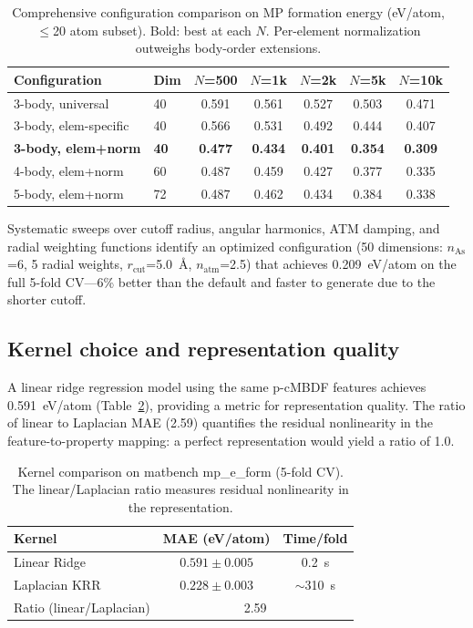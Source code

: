 \documentclass[twocolumn]{article}
\begin{document}
\begin{table}[t]
\centering
\small
\caption{Comprehensive configuration comparison on MP formation energy (eV/atom, $\leq$20 atom subset). Bold: best at each $N$. Per-element normalization outweighs body-order extensions.}
\label{tab:comprehensive}
\begin{tabular}{llccccc}
\toprule
Configuration & Dim & $N$=500 & $N$=1k & $N$=2k & $N$=5k & $N$=10k \\
\midrule
3-body, universal & 40 & 0.591 & 0.561 & 0.527 & 0.503 & 0.471 \\
3-body, elem-specific & 40 & 0.566 & 0.531 & 0.492 & 0.444 & 0.407 \\
\textbf{3-body, elem+norm} & \textbf{40} & \textbf{0.477} & \textbf{0.434} & \textbf{0.401} & \textbf{0.354} & \textbf{0.309} \\
4-body, elem+norm & 60 & 0.487 & 0.459 & 0.427 & 0.377 & 0.335 \\
5-body, elem+norm & 72 & 0.487 & 0.462 & 0.434 & 0.384 & 0.338 \\
\bottomrule
\end{tabular}
\end{table}

Systematic sweeps over cutoff radius, angular harmonics, ATM damping, and radial weighting functions identify an optimized configuration (50 dimensions: $n_\text{As}$=6, 5 radial weights, $r_\text{cut}$=5.0~\AA, $n_\text{atm}$=2.5) that achieves 0.209~eV/atom on the full 5-fold CV---6\% better than the default and faster to generate due to the shorter cutoff.

\subsection{Kernel choice and representation quality}

A linear ridge regression model using the same p-cMBDF features achieves 0.591~eV/atom (Table~\ref{tab:kernels}), providing a metric for representation quality.
The ratio of linear to Laplacian MAE (2.59) quantifies the residual nonlinearity in the feature-to-property mapping: a perfect representation would yield a ratio of 1.0.

\begin{table}[h]
\centering
\small
\caption{Kernel comparison on matbench mp\_e\_form (5-fold CV). The linear/Laplacian ratio measures residual nonlinearity in the representation.}
\label{tab:kernels}
\begin{tabular}{lcc}
\toprule
Kernel & MAE (eV/atom) & Time/fold \\
\midrule
Linear Ridge & $0.591 \pm 0.005$ & 0.2~s \\
Laplacian KRR & $0.228 \pm 0.003$ & $\sim$310~s \\
\midrule
Ratio (linear/Laplacian) & \multicolumn{2}{c}{2.59} \\
\bottomrule
\end{tabular}
\end{table}
\end{document}
